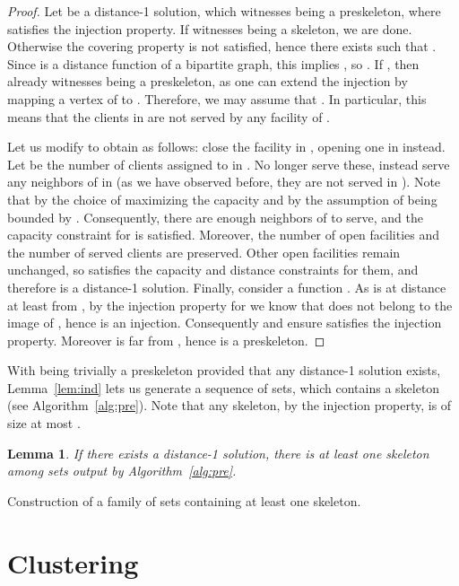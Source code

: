 \documentclass{article}
\theoremstyle{plain}
\newtheorem{lemma}[theorem]{Lemma}
\theoremstyle{definition}
\begin{document}
\begin{proof}
Let  be a distance-1 solution, which witnesses  being a preskeleton,
where  satisfies the injection property.
If  witnesses  being a skeleton, we are done.
Otherwise the covering property is not satisfied,
hence there exists  such that .
Since  is a distance function of a bipartite graph, 
this implies , so .
If , then  already witnesses  being a
preskeleton, as one can extend the injection  by mapping 
a vertex of  to .
Therefore, we may assume that .
In particular, this means that the clients in  are not served by any
facility of .

Let us modify  to obtain  as follows:
close the facility in , opening one in  instead.
Let  be the number of clients assigned to  in .
No longer serve these, instead serve any  neighbors of  in
 (as we have observed before, they are not served in ).
Note that  by the choice of  maximizing the
capacity and by the assumption of  being bounded by .
Consequently, there are enough neighbors of  to serve, and the capacity
constraint for  is satisfied.
Moreover, the number of open facilities and the number of served clients are
preserved.
Other open facilities remain unchanged, so  satisfies
the capacity and distance constraints for them, and therefore is a distance-1 solution.
Finally, consider a function .
As  is at distance at least  from , by the 
injection property for  we know that  does not belong to the image of ,
hence  is an injection.
Consequently  and  ensure  satisfies the injection property.
Moreover  is far from , hence  is a preskeleton.
\end{proof}

With  being trivially a preskeleton provided that any distance-1
solution exists, Lemma~\ref{lem:ind} lets us generate a sequence of
sets, which contains a skeleton (see Algorithm~\ref{alg:pre}).
Note that any skeleton, by the injection property, is of size at most .

\begin{lemma}
If there exists a distance-1 solution, there is at least one skeleton among sets
output by Algorithm~\ref{alg:pre}.
\end{lemma}
\begin{algorithm}
\caption{Construction of a family of sets containing at least one skeleton.}\label{alg:pre}
\;
\vspace{.2cm}
\end{algorithm} 

\section{Clustering}
\label{sec:clustering}
\end{document}
